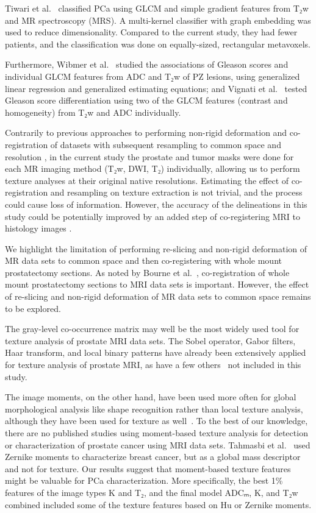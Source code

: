 Tiwari et al.\ \cite{Tiwari2013} classified PCa using GLCM and simple gradient
features from T₂w and MR spectroscopy (MRS). A multi-kernel classifier with
graph embedding was used to reduce dimensionality. Compared to the current
study, they had fewer patients, and the classification was done on
equally-sized, rectangular metavoxels.

Furthermore, Wibmer et al.\ \cite{Wibmer2015} studied the associations of
Gleason scores and individual GLCM features from ADC and T₂w of PZ lesions,
using generalized linear regression and generalized estimating equations; and
Vignati et al.\ \cite{Vignati2015} tested Gleason score differentiation using
two of the GLCM features (contrast and homogeneity) from T₂w and ADC
individually.

Contrarily to previous approaches to performing non-rigid deformation and
co-registration of datasets with subsequent resampling to common space and
resolution \citep{Viswanath2012, Ginsburg2014}, in the current study the
prostate and tumor masks were done for each MR imaging method (T₂w, DWI, T₂)
individually, allowing us to perform texture analyses at their original native
resolutions. Estimating the effect of co-registration and resampling on texture
extraction is not trivial, and the process could cause loss of information.
However, the accuracy of the delineations in this study could be potentially
improved by an added step of co-registering MRI to histology images
\citep{Bourne2017}.

We highlight the limitation of performing re-slicing and
non-rigid deformation of MR data sets to common space and then co-registering
with whole mount prostatectomy sections. As noted by Bourne et
al.\ \cite{Bourne2017}, co-registration of whole mount prostatectomy sections to
MRI data sets is important. However, the effect of re-slicing and non-rigid
deformation of MR data sets to common space remains to be explored.

The gray-level co-occurrence matrix may well be the most widely used tool for
texture analysis of prostate MRI data sets. The Sobel operator, Gabor filters,
Haar transform, and local binary patterns have already been extensively applied
for texture analysis of prostate MRI, as have a few others~\citep{Lemaitre2015}
not included in this study.

The image moments, on the other hand, have been used more often for global
morphological analysis like shape recognition rather than local texture
analysis, although they have been used for texture as well~\citep{Tuceryan1994,
Laws1980, Tuceryan1990}. To the best of our knowledge, there are no published
studies using moment-based texture analysis for detection or characterization of
prostate cancer using MRI data sets. Tahmasbi et al.\ \cite{Tahmasbi2011} used
Zernike moments to characterize breast cancer, but as a global mass descriptor
and not for texture. Our results suggest that moment-based texture features
might be valuable for PCa characterization. More specifically, the best 1\%
features of the image types K and T₂, and the final model ADCₘ, K, and T₂w
combined included some of the texture features based on Hu or Zernike moments.

